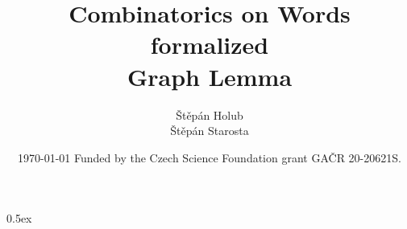 \documentclass[11pt,a4paper]{report}
\begin{document}
\title{Combinatorics on Words formalized \\ Graph Lemma}
\author{Štěpán Holub \\ Štěpán Starosta }
  

 \date{ \today
 \vfill
  Funded by the Czech Science Foundation grant GA\v CR 20-20621S.}
  
\maketitle


\tableofcontents
\vspace{\baselineskip}

\parindent 0pt\parskip 0.5ex



\cleardoublepage
{}
{}
\renewcommand{\bibname}{References}


\end{document}
